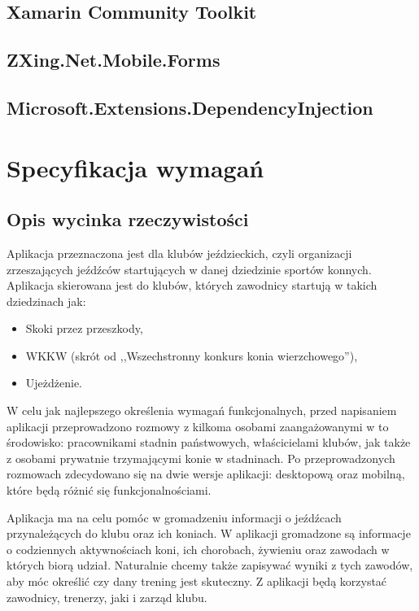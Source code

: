 \documentclass[12pt,oneside]{report}
\begin{document}
\section{Xamarin Community Toolkit}

\section{ZXing.Net.Mobile.Forms}

\section{Microsoft.Extensions.DependencyInjection}
\chapter{Specyfikacja wymagań}
\section{Opis wycinka rzeczywistości}
Aplikacja przeznaczona jest dla klubów jeździeckich, czyli organizacji zrzeszających jeźdźców startujących w danej dziedzinie sportów konnych. Aplikacja skierowana jest do klubów, których zawodnicy startują w takich dziedzinach jak:
\begin{itemize}
	\item Skoki przez przeszkody,
	\item WKKW (skrót od ,,Wszechstronny konkurs konia wierzchowego''),
	\item Ujeżdżenie.
\end{itemize}

W celu jak najlepszego określenia wymagań funkcjonalnych, przed napisaniem aplikacji przeprowadzono rozmowy z kilkoma osobami zaangażowanymi w to środowisko: pracownikami stadnin państwowych, właścicielami klubów, jak także z osobami prywatnie trzymającymi konie w stadninach. Po przeprowadzonych rozmowach zdecydowano się na dwie wersje aplikacji: desktopową oraz mobilną, które będą różnić się funkcjonalnościami.

Aplikacja ma na celu pomóc w gromadzeniu informacji o jeźdźcach przynależących do klubu oraz ich koniach. W aplikacji gromadzone są informacje o codziennych aktywnościach koni, ich chorobach, żywieniu oraz zawodach w których biorą udział. Naturalnie chcemy także zapisywać wyniki z tych zawodów, aby móc określić czy dany trening jest skuteczny. Z aplikacji będą korzystać zawodnicy, trenerzy, jaki i zarząd klubu.
\end{document}
